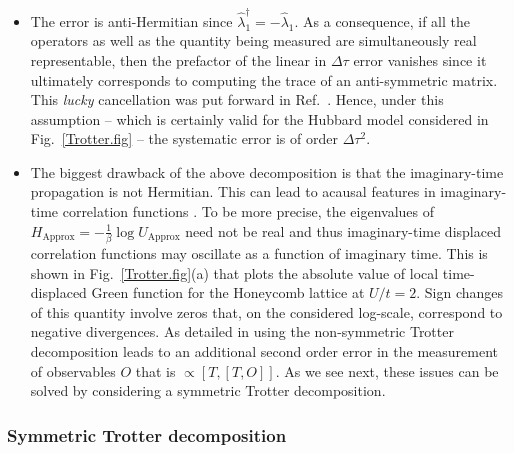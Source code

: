 \begin{itemize}
\item    The error is anti-Hermitian  since $\hat{\lambda}_1^{\dagger} = - \hat{\lambda}_1 $. As a consequence, if all the operators as well as the quantity being measured are simultaneously real representable,  then   the prefactor of the linear in $\Delta  \tau$ error vanishes since it ultimately corresponds to computing the trace of an  anti-symmetric matrix. This \textit{lucky}   cancellation was put forward in  Ref.~\cite{Fye86}.   Hence, under this assumption -- which is certainly valid for the Hubbard model considered in Fig.~\ref{Trotter.fig} -- the systematic error is of order $\Delta \tau^2$.
\item  The biggest drawback  of the above decomposition is that  the imaginary-time propagation is not Hermitian.   This can lead to acausal  features in imaginary-time correlation functions \cite{Beyl_thesis}. To be more precise, the eigenvalues of  
$  H_{\text{Approx}} = - \frac{1}{\beta} \log  U_{\text{Approx}}$ need not be real and thus imaginary-time displaced correlation functions may oscillate as a function of imaginary time.   
This is shown in  Fig.~\ref{Trotter.fig}(a)  that plots the  absolute value of local time-displaced Green function for  the Honeycomb lattice at $U/t=2$.  Sign changes of this quantity   involve zeros  that, on the considered log-scale,  correspond to negative divergences.
As detailed in \cite{goth2020} using the non-symmetric Trotter decomposition 
leads to an additional second order error in the measurement of observables $O$
that is $\propto [T,[T,O]]$.
As we see next, these issues can be solved by considering a symmetric  Trotter decomposition.
\end{itemize}


\subsubsection{Symmetric Trotter decomposition} 

